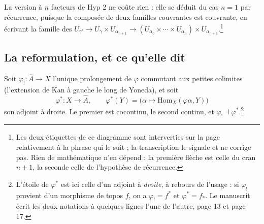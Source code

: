 \documentclass[11pt,a4paper]{article}
\begin{document}
La version à $n$ facteurs de Hyp 2 ne coûte rien : elle se déduit du cas
$n = 1$ par récurrence, puisque la composée de deux familles couvrantes est
couvrante, en écrivant la famille des
$U_{\gamma'} \to U_{\gamma} \times U_{\alpha_{n+1}} \to
(U_{\alpha_{0}} \times \cdots \times U_{\alpha_{n}}) \times
U_{\alpha_{n+1}}$.\footnote{Les deux étiquettes de ce diagramme sont
interverties sur la page relativement à la phrase qui le suit ; la
transcription le signale et ne corrige pas. Rien de mathématique n'en dépend :
la première flèche est celle du cran $n+1$, la seconde celle de l'hypothèse de
récurrence.}

\subsection*{La reformulation, et ce qu'elle dit}

Soit $\varphi_{!} \colon \widehat{A} \to X$ l'unique prolongement de $\varphi$
commutant aux petites colimites (l'extension de Kan à gauche le long de
Yoneda), et soit
\[
  \varphi^{*} \colon X \longrightarrow \widehat{A}, \qquad
  \varphi^{*}(Y) = \bigl(\alpha \mapsto \mathrm{Hom}_{X}(\varphi\alpha, Y)\bigr)
\]
son adjoint à droite. Le premier est cocontinu, le second continu, et
$\varphi_{!} \dashv \varphi^{*}$.\footnote{L'étoile de $\varphi^{*}$ est ici
celle d'un adjoint à \emph{droite}, à rebours de l'usage : si $\varphi_{!}$
provient d'un morphisme de topos $f$, on a $\varphi_{!} = f^{*}$ et
$\varphi^{*} = f_{*}$. Le manuscrit écrit les deux notations à quelques lignes
l'une de l'autre, page 13 et page 17.}
\end{document}

